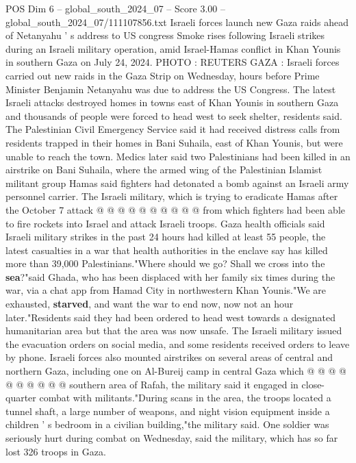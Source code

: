 \begin{textsample}{POS Dim 6 – global\_south\_2024\_07 – Score 3.00 – global\_south\_2024\_07/111107856.txt}  \label{ex:f6_pos_340}
Israeli forces launch new Gaza raids ahead of Netanyahu ' s address to US congress Smoke rises following Israeli strikes during an Israeli military operation, amid Israel-Hamas conflict in Khan Younis in southern Gaza on July 24, 2024.
PHOTO : REUTERS GAZA : Israeli forces carried out new raids in the Gaza Strip on Wednesday, hours before Prime Minister Benjamin Netanyahu was due to address the US Congress.
The latest Israeli attacks destroyed homes in towns east of Khan Younis in southern Gaza and thousands of people were forced to head west to seek shelter, residents said.
The Palestinian Civil Emergency Service said it had received distress calls from residents trapped in their homes in Bani Suhaila, east of Khan Younis, but were unable to reach the town.
Medics later said two Palestinians had been killed in an airstrike on Bani Suhaila, where the armed wing of the Palestinian Islamist militant group Hamas said fighters had detonated a bomb against an Israeli army personnel carrier.
The Israeli military, which is trying to eradicate Hamas after the October 7 attack @ @ @ @ @ @ @ @ @ @ from which fighters had been able to fire rockets into Israel and attack Israeli troops.
Gaza health officials said Israeli military strikes in the past 24 hours had killed at least 55 people, the latest casualties in a war that health authorities in the enclave say has killed more than 39,000 Palestinians."Where should we go?
Shall we cross into the \textbf{sea}?"said Ghada, who has been displaced with her family six times during the war, via a chat app from Hamad City in northwestern Khan Younis."We are exhausted, \textbf{starved}, and want the war to end now, now not an hour later."Residents said they had been ordered to head west towards a designated humanitarian area but that the area was now unsafe.
The Israeli military issued the evacuation orders on social media, and some residents received orders to leave by phone.
Israeli forces also mounted airstrikes on several areas of central and northern Gaza, including one on Al-Bureij camp in central Gaza which @ @ @ @ @ @ @ @ @ @ southern area of Rafah, the military said it engaged in close-quarter combat with militants."During scans in the area, the troops located a tunnel shaft, a large number of weapons, and night vision equipment inside a children ' s bedroom in a civilian building,"the military said.
One soldier was seriously hurt during combat on Wednesday, said the military, which has so far lost 326 troops in Gaza.

\end{textsample}
